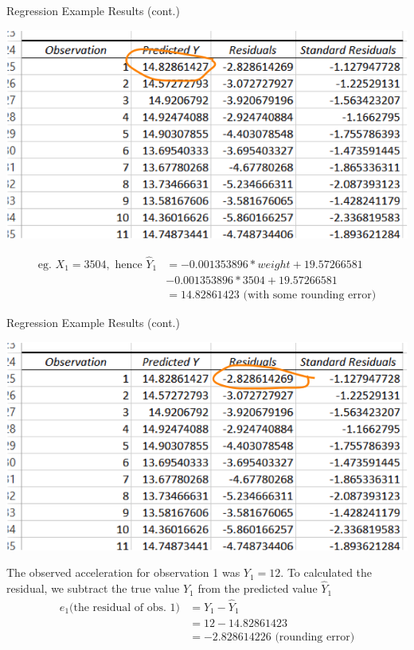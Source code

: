 \documentclass[xcolor=svgnames]{beamer}
\begin{document}
\begin{frame}[label=current]{Regression Example Results (cont.)}
\begin{center}
\includegraphics[width=.75\textwidth]{RER1a}
\end{center}
\begin{align*}
\text{eg. }X_1=3504, \text{ hence } \hat Y_1 &= -0.001353896*weight + 19.57266581 \\
&-0.001353896*3504 + 19.57266581\\
& = 14.82861423 \text{ (with some rounding error)}
\end{align*}
\end{frame}


\begin{frame}[label=current]{Regression Example Results (cont.)}
\begin{center}
\includegraphics[width=.75\textwidth]{RER1b}
\end{center}
The observed acceleration for observation 1 was $Y_1=12$.  To calculated the residual, we subtract the true value $Y_1$ from the predicted value $\hat Y_1$
\begin{align*}
e_1 \text{(the residual of obs. 1)} &= Y_1 - \hat Y_1\\
&= 12 - 14.82861423 \\
& = -2.828614226 \text{ (rounding error)}
\end{align*}
\end{frame}
\end{document}

